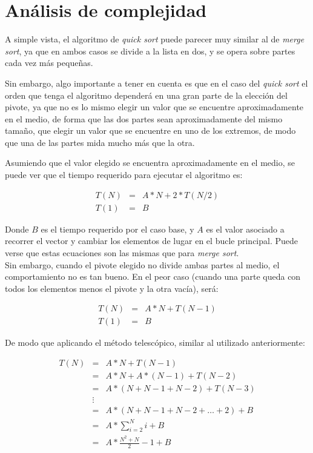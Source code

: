 \section{Análisis de complejidad}

A simple vista, el algoritmo de \textit{quick sort} puede parecer muy
similar al de \textit{merge sort}, ya que en ambos casos se divide a la
lista en dos, y se opera sobre partes cada vez más pequeñas.

Sin embargo, algo importante a tener en cuenta es que en el caso del
\textit{quick sort} el orden que tenga el algoritmo dependerá en una gran
parte de la elección del pivote, ya que no es lo mismo elegir un valor que
se encuentre aproximadamente en el medio, de forma que las dos partes sean
aproximadamente del mismo tamaño, que elegir un valor que se encuentre en
uno de los extremos, de modo que una de las partes mida mucho más que la
otra.

Asumiendo que el valor elegido se encuentra aproximadamente en el medio,
se puede ver que el tiempo requerido para ejecutar el algoritmo es:

\begin{eqnarray}
T(N) &=& A * N + 2*T(N/2) \\
T(1) &=& B
\end{eqnarray}

Donde $B$ es el tiempo requerido por el caso base, y $A$ es el valor asociado
a recorrer el vector y cambiar los elementos de lugar en el bucle
principal.  Puede verse que estas ecuaciones son las mismas que para
\textit{merge sort}. \\

Sin embargo, cuando el pivote elegido no divide ambas partes al medio, el
comportamiento no es tan bueno.  En el peor caso (cuando una parte queda
con todos los elementos menos el pivote y la otra vacía), será:

\begin{eqnarray}
T(N) &=& A * N + T(N-1) \\
T(1) &=& B
\end{eqnarray}

De modo que aplicando el método telescópico, similar al utilizado
anteriormente:

\begin{eqnarray}
T(N) &=& A * N + T(N-1) \\
&=& A * N + A * (N-1) + T(N-2) \\
&=& A * (N + N - 1 + N - 2) + T(N-3) \\
&\vdots&\\
&=&A * (N + N - 1 + N - 2 + \hdots + 2) + B\\
&=&A * \sum_{i=2}^N{i} + B\\
&=&A * \frac{N^2+N}{2} - 1 + B
\end{eqnarray}

